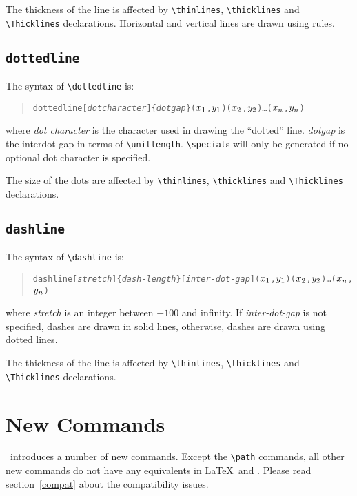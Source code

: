 The thickness of the line is affected by \verb|\thinlines|,
\verb|\thicklines| and \verb|\Thicklines| declarations.
Horizontal and vertical lines are drawn using rules.


\subsection{\tt \BS dottedline}
The syntax of \verb|\dottedline| is:
\begin{quote}
\begin{alltt}
\BS{}dottedline[{\em{}dot character\/}]\{{\em{}dotgap\/}\}(\(x\sb{1}\),\(y\sb{1}\))(\(x\sb{2}\),\(y\sb{2}\))\ldots(\(x\sb{n}\),\(y\sb{n}\))
\end{alltt}
\end{quote}
where {\em dot character} is the character used in drawing the
``dotted'' line. {\em dotgap} is the interdot gap in terms of
\verb|\unitlength|. \verb|\special|s will only be generated if no
optional dot character is specified.

The size of the dots are affected by \verb|\thinlines|,
\verb|\thicklines| and \verb|\Thicklines| declarations.


\subsection{\tt \BS dashline}
The syntax of \verb|\dashline| is:
\begin{quote}
\begin{alltt}
\BS{}dashline[{\em{}stretch}]\{{\em{}dash-length}\}[{\em{}inter-dot-gap}](\(x\sb{1}\),\(y\sb{1}\))(\(x\sb{2}\),\(y\sb{2}\))\ldots(\(x\sb{n}\),\(y\sb{n}\))
\end{alltt}
\end{quote}
where {\em stretch} is an integer between $-100$ and infinity. If
{\em inter-dot-gap} is not specified, dashes are drawn in solid
lines, otherwise, dashes are drawn using dotted lines.

The thickness of the line is affected by \verb|\thinlines|,
\verb|\thicklines| and \verb|\Thicklines| declarations.


\clearpage


\section{New Commands}
\eepic\ introduces a number of new commands. Except the
\verb|\path| commands, all other new commands do not have any
equivalents in \LaTeX\ and \epic. Please read
section~\ref{compat} about the compatibility issues.


